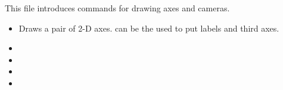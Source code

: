 This file introduces commands for drawing axes and cameras.

\begin{itemize}
\item {} Draws a pair of 2-D axes.  can be the used to put labels and third axes.
\item {}
\item {}
\item {}
\item {}
\end{itemize}
